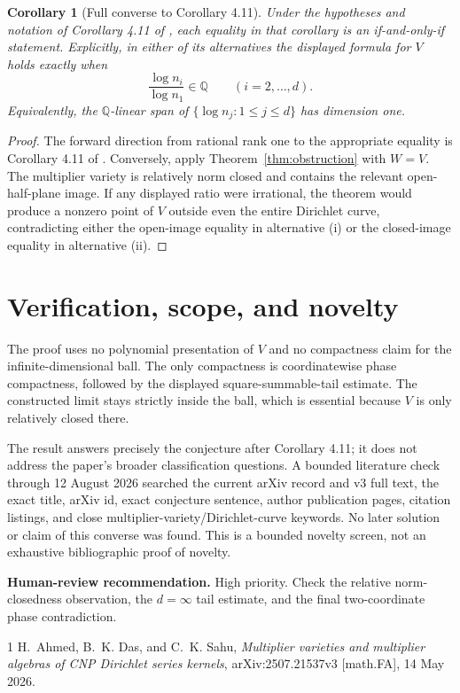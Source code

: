\documentclass[11pt]{article}
\newtheorem{corollary}[theorem]{Corollary}
\newcommand{\Q}{\mathbb Q}
\begin{document}
\begin{corollary}[Full converse to Corollary 4.11]\label{cor:characterization}
Under the hypotheses and notation of Corollary 4.11 of
\cite{AhmedDasSahu}, each equality in that corollary is an if-and-only-if
statement.  Explicitly, in either of its alternatives the displayed formula
for $V$ holds exactly when
\[
 \frac{\log n_i}{\log n_1}\in\Q\qquad(i=2,\ldots,d).
\]
Equivalently, the $\Q$-linear span of $\{\log n_j:1\le j\le d\}$ has
dimension one.
\end{corollary}

\begin{proof}
The forward direction from rational rank one to the appropriate equality is
Corollary 4.11 of \cite{AhmedDasSahu}.  Conversely, apply
Theorem~\ref{thm:obstruction} with $W=V$.  The multiplier variety is relatively
norm closed and contains the relevant open-half-plane image.  If any displayed
ratio were irrational, the theorem would produce a nonzero point of $V$
outside even the entire Dirichlet curve, contradicting either the open-image
equality in alternative (i) or the closed-image equality in alternative (ii).
\end{proof}

\section{Verification, scope, and novelty}

The proof uses no polynomial presentation of $V$ and no compactness claim for
the infinite-dimensional ball.  The only compactness is coordinatewise phase
compactness, followed by the displayed square-summable-tail estimate.  The
constructed limit stays strictly inside the ball, which is essential because
$V$ is only relatively closed there.

The result answers precisely the conjecture after Corollary 4.11; it does not
address the paper's broader classification questions.  A bounded literature
check through 12 August 2026 searched the current arXiv record and v3 full
text, the exact title, arXiv id, exact conjecture sentence, author publication
pages, citation listings, and close multiplier-variety/Dirichlet-curve
keywords.  No later solution or claim of this converse was found.  This is a
bounded novelty screen, not an exhaustive bibliographic proof of novelty.

\medskip
\noindent\textbf{Human-review recommendation.}
High priority.  Check the relative norm-closedness observation, the
$d=\infty$ tail estimate, and the final two-coordinate phase contradiction.

\begin{thebibliography}{1}
H.~Ahmed, B.~K. Das, and C.~K. Sahu,
\emph{Multiplier varieties and multiplier algebras of CNP Dirichlet series
kernels}, arXiv:2507.21537v3 [math.FA], 14 May 2026.
\end{thebibliography}
\end{document}
